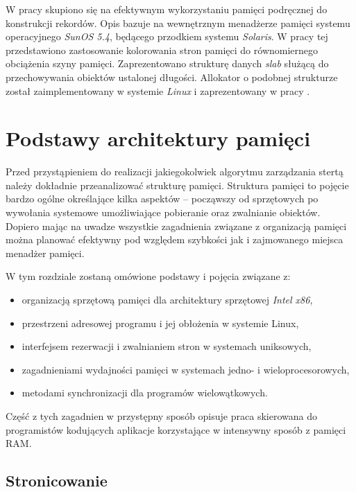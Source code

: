 \documentclass[12pt,a4paper,titlepage,twoside]{mwart}
\begin{document}
W pracy \cite{bonwick94slab} skupiono się na efektywnym wykorzystaniu pamięci
podręcznej do konstrukcji rekordów. Opis bazuje na wewnętrznym menadżerze
pamięci systemu operacyjnego \textit{SunOS 5.4}, będącego przodkiem systemu
\textit{Solaris}. W pracy tej przedstawiono zastosowanie kolorowania stron
pamięci do równomiernego obciążenia szyny pamięci. Zaprezentowano strukturę
danych \textit{slab} służącą do przechowywania obiektów ustalonej długości.
Allokator o podobnej strukturze został zaimplementowany w systemie
\textit{Linux} i zaprezentowany w pracy \cite{fitzgibbons00linux}.

\newpage


\section{Podstawy architektury pamięci}
\hypertarget{Architektura}{}

Przed przystąpieniem do realizacji jakiegokolwiek algorytmu zarządzania stertą
należy dokładnie przeanalizować strukturę pamięci. Struktura pamięci to pojęcie
bardzo ogólne określające kilka aspektów -- począwszy od sprzętowych po
wywołania systemowe umożliwiające pobieranie oraz zwalnianie obiektów. Dopiero
mając na uwadze wszystkie zagadnienia związane z organizacją pamięci można
planować efektywny pod względem szybkości jak i zajmowanego miejsca menadżer
pamięci.

W tym rozdziale zostaną omówione podstawy i pojęcia związane z:
\begin{itemize}
\item organizacją sprzętową pamięci dla architektury sprzętowej \textit{Intel x86},
\item przestrzeni adresowej programu i jej obłożenia w systemie Linux,
\item interfejsem rezerwacji i zwalnianiem stron w systemach uniksowych,
\item zagadnieniami wydajności pamięci w systemach jedno- i wieloprocesorowych,
\item metodami synchronizacji dla programów wielowątkowych.
\end{itemize}

Część z tych zagadnien w przystępny sposób opisuje praca \cite{pas02memory}
skierowana do programistów kodujących aplikacje korzystające w intensywny
sposób z pamięci RAM.

\subsection{Stronicowanie}
\end{document}
